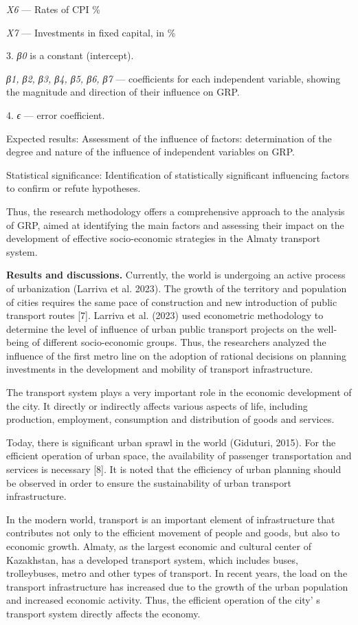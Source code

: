 \emph{X6} --- Rates of CPI \%

\emph{X7} --- Investments in fixed capital, in \%

3. \emph{β0} is a constant (intercept).

\emph{β1, β2, β3, β4, β5, β6, β7} --- coefficients for each independent
variable, showing the magnitude and direction of their influence on GRP.

4. \emph{ϵ} --- error coefficient.

Expected results: Assessment of the influence of factors: determination
of the degree and nature of the influence of independent variables on
GRP.

Statistical significance: Identification of statistically significant
influencing factors to confirm or refute hypotheses.

Thus, the research methodology offers a comprehensive approach to the
analysis of GRP, aimed at identifying the main factors and assessing
their impact on the development of effective socio-economic strategies
in the Almaty transport system.

{\bfseries Results and discussions.} Currently, the world is undergoing an
active process of urbanization (Larriva et al. 2023). The growth of the
territory and population of cities requires the same pace of
construction and new introduction of public transport routes {[}7{]}.
Larriva et al. (2023) used econometric methodology to determine the
level of influence of urban public transport projects on the well-being
of different socio-economic groups. Thus, the researchers analyzed the
influence of the first metro line on the adoption of rational decisions
on planning investments in the development and mobility of transport
infrastructure.

The transport system plays a very important role in the economic
development of the city. It directly or indirectly affects various
aspects of life, including production, employment, consumption and
distribution of goods and services.

Today, there is significant urban sprawl in the world (Giduturi, 2015).
For the efficient operation of urban space, the availability of
passenger transportation and services is necessary {[}8{]}. It is noted
that the efficiency of urban planning should be observed in order to
ensure the sustainability of urban transport infrastructure.

In the modern world, transport is an important element of infrastructure
that contributes not only to the efficient movement of people and goods,
but also to economic growth. Almaty, as the largest economic and
cultural center of Kazakhstan, has a developed transport system, which
includes buses, trolleybuses, metro and other types of transport. In
recent years, the load on the transport infrastructure has increased due
to the growth of the urban population and increased economic activity.
Thus, the efficient operation of the city' s transport
system directly affects the economy.

